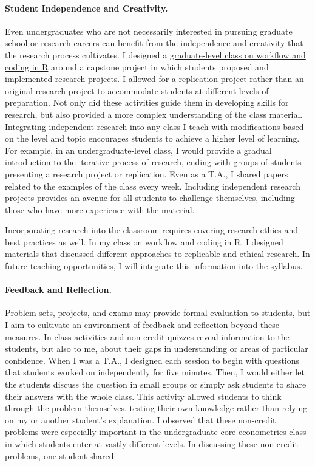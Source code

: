 \paragraph{Student Independence and Creativity.} Even undergraduates who are not necessarily interested in pursuing graduate school or research careers can benefit from the independence and creativity that the research process cultivates. I designed a \href{https://github.com/aziff/R-Workflow-for-Economists}{graduate-level class on workflow and coding in R} around a capstone project in which students proposed and implemented research projects. I allowed for a replication project rather than an original research project to accommodate students at different levels of preparation. Not only did these activities guide them in developing skills for research, but also provided a more complex understanding of the class material. Integrating independent research into any class I teach with modifications based on the level and topic encourages students to achieve a higher level of learning. For example, in an undergraduate-level class, I would provide a gradual introduction to the iterative process of research, ending with groups of students presenting a research project or replication. Even as a T.A., I shared papers related to the examples of the class every week. Including independent research projects provides an avenue for all students to challenge themselves, including those who have more experience with the material. 

Incorporating research into the classroom requires covering research ethics and best practices as well. In my class on workflow and coding in R, I designed materials that discussed different approaches to replicable and ethical research. In future teaching opportunities, I will integrate this information into the syllabus.

\paragraph{Feedback and Reflection.} Problem sets, projects, and exams may provide formal evaluation to students, but I aim to cultivate an environment of feedback and reflection beyond these measures. In-class activities and non-credit quizzes reveal information to the students, but also to me, about their gaps in understanding or areas of particular confidence. When I was a T.A., I designed each session to begin with questions that students worked on independently for five minutes. Then, I would either let the students discuss the question in small groups or simply ask students to share their answers with the whole class. This activity allowed students to think through the problem themselves, testing their own knowledge rather than relying on my or another student's explanation. I observed that these non-credit problems were especially important in the undergraduate core econometrics class in which students enter at vastly different levels. In discussing these non-credit problems, one student shared:

